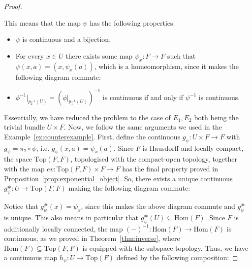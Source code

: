 \begin{proof}
\begin{center}
\end{center}
This means that the map $\psi$ has the following properties:
\begin{itemize}
\item $\psi$ is continuous and a bijection.
\item For every $x\in U$ there exists some map $\psi_x:F\to F$ such that $\psi(x,a)=(x,\psi_x(a))$, which is a homeomorphism, since it makes the following diagram commute:
\vspace*{-1em}
\begin{center}
\end{center}
\item $\phi^{-1}|_{p_2^{-1}(U)}=(\phi|_{p_1^{-1}(U)})^{-1}$ is continuous if and only if $\psi^{-1}$ is continuous.
\end{itemize}
Essentially, we have reduced the problem to the case of $E_1,E_2$ both being the trivial bundle $U\times F$. Now, we follow the same arguments we used in the Example~\ref{ex:counterexample}. First, define the continuous $g_{\psi}:U\times F\to F$ with $g_{\psi}=\pi_2\circ\psi$, i.e. $g_{\psi}(x,a)=\psi_x(a)$. Since $F$ is Hausdorff and locally compact, the space $\mathrm{Top}(F,F)$, topologised with the compact-open topology, together with the map $ev:\mathrm{Top}(F,F)\times F\to F$ has the final property proved in Proposition~\ref{prop:exponential_object}. So, there exists a unique continuous $g_{\psi}^{\#}:U\to\mathrm{Top}(F,F)$ making the following diagram commute:
\begin{center}
\end{center}
Notice that $g_{\psi}^{\#}(x)=\psi_x$, since this makes the above diagram commute and $g_{\psi}^{\#}$ is unique. This also means in particular that $g_{\psi}^{\#}(U)\subseteq\mathrm{Hom}(F)$. Since $F$ is additionally locally connected, the map $(-)^{-1}:\mathrm{Hom}(F)\to\mathrm{Hom}(F)$ is continuous, as we proved in Theorem~\ref{thm:inverse}, where $\mathrm{Hom}(F)\subseteq\mathrm{Top}(F,F)$ is equipped with the subspace topology. Thus, we have a continuous map $h_{\psi}:U\to\mathrm{Top}(F)$ defined by the following composition:

\end{proof}
